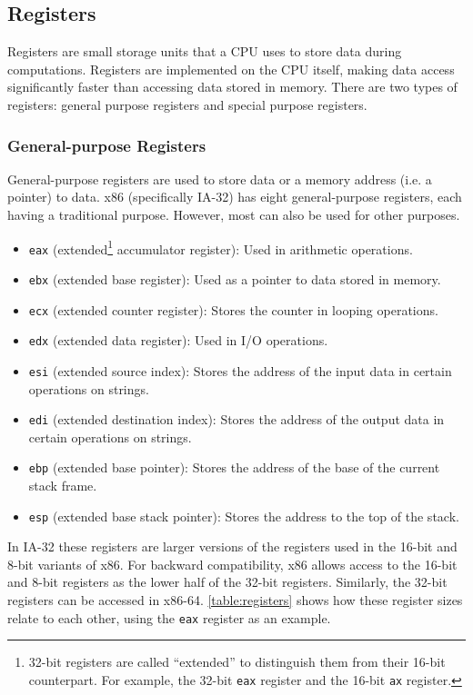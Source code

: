 
\subsection{Registers}\label{section:registers}
Registers are small storage units that a CPU uses to store data during computations. Registers are implemented on the CPU itself, making data access significantly faster than accessing data stored in memory. There are two types of registers: general purpose registers and special purpose registers.

\subsubsection{General-purpose Registers}
General-purpose registers are used to store data or a memory address (i.e. a pointer) to data. x86 (specifically IA-32) has eight general-purpose registers, each having a traditional purpose. However, most can also be used for other purposes.

\begin{itemize}
    \item \texttt{eax} (extended\footnote{32-bit registers are called ``extended'' to distinguish them from their 16-bit counterpart. For example, the 32-bit \texttt{eax} register and the 16-bit \texttt{ax} register.} accumulator register): Used in arithmetic operations.
    \item \texttt{ebx} (extended base register): Used as a pointer to data stored in memory.
    \item \texttt{ecx} (extended counter register): Stores the counter in looping operations.
    \item \texttt{edx} (extended data register): Used in I/O operations.
    \item \texttt{esi} (extended source index): Stores the address of the input data in certain operations on strings.
    \item \texttt{edi} (extended destination index): Stores the address of the output data in certain operations on strings.
    \item \texttt{ebp} (extended base pointer): Stores the address of the base of the current stack frame.
    \item \texttt{esp} (extended base stack pointer): Stores the address to the top of the stack.
\end{itemize}

In IA-32 these registers are larger versions of the registers used in the 16-bit and 8-bit variants of x86. For backward compatibility, x86 allows access to the 16-bit and 8-bit registers as the lower half of the 32-bit registers. Similarly, the 32-bit registers can be accessed in x86-64. \autoref{table:registers} shows how these register sizes relate to each other, using the \texttt{eax} register as an example.

